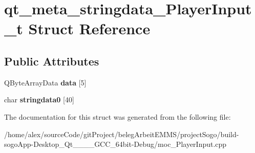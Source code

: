 \hypertarget{structqt__meta__stringdata__PlayerInput__t}{\section{qt\-\_\-meta\-\_\-stringdata\-\_\-\-Player\-Input\-\_\-t Struct Reference}
\label{structqt__meta__stringdata__PlayerInput__t}
}
\subsection*{Public Attributes}
\begin{DoxyCompactItemize}
\item 
\hypertarget{structqt__meta__stringdata__PlayerInput__t_a7ee4486c9d44aa2055d4f37c8b279872}{Q\-Byte\-Array\-Data {\bfseries data} \mbox{[}5\mbox{]}}\label{structqt__meta__stringdata__PlayerInput__t_a7ee4486c9d44aa2055d4f37c8b279872}

\item 
\hypertarget{structqt__meta__stringdata__PlayerInput__t_a9759ec43b5cc526d44e03d75020f0034}{char {\bfseries stringdata0} \mbox{[}40\mbox{]}}\label{structqt__meta__stringdata__PlayerInput__t_a9759ec43b5cc526d44e03d75020f0034}

\end{DoxyCompactItemize}


The documentation for this struct was generated from the following file\-:\begin{DoxyCompactItemize}
\item 
/home/alex/source\-Code/git\-Project/beleg\-Arbeit\-E\-M\-M\-S/project\-Sogo/build-\/sogo\-App-\/\-Desktop\-\_\-\-Qt\-\_\-\_\-\_\-\_\-\-G\-C\-C\-\_\-64bit-\/\-Debug/moc\-\_\-\-Player\-Input.\-cpp\end{DoxyCompactItemize}
